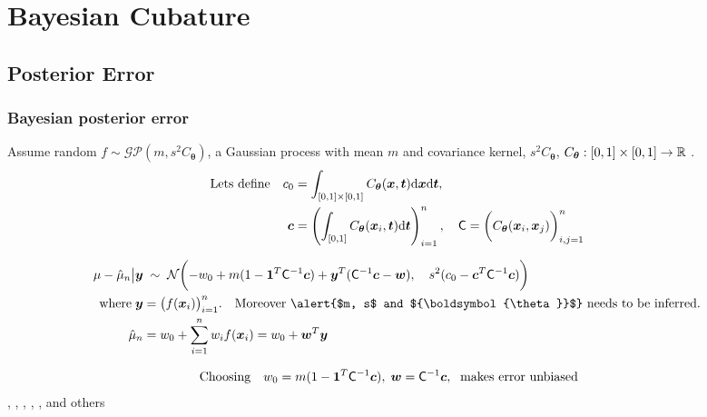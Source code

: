 \documentclass[handout, 10pt,compress,xcolor={usenames,dvipsnames}]{beamer} %
\newcommand{\bm}[1]{\boldsymbol{#1}}
\newcommand{\mCInv}{\mC^{-1}}
\newcommand{\dvx}{\dif {\vx}}
\newcommand{\dvt}{\dif {\vt}}
\renewcommand{\vtheta}{{\bm{\theta}}}
\newcommand{\pause}{}
\begin{document}
\section{Bayesian Cubature}


\subsection{Posterior Error}


\begin{frame}
\frametitle{Bayesian posterior error}
\vspace*{-4ex}
\alert{Assume random}
$f \sim \mathcal{GP} (m, s^2C_{\vtheta})$,
a \alert{Gaussian process} with mean $m$ and covariance kernel, $s^2C_{\vtheta}$, $C_{\vtheta}:[0,1] \times [0,1] \to \reals$ .
\vspace*{-1ex}
\begin{align*}
\text{Lets define} \quad c_0 &= \int_{[0,1] \times [0,1]} C_{\vtheta} (\vx,\vt) \dvx \dvt, 
\\
\vc& = \left( \int_{[0,1] } C_{\vtheta} (\vx_i,\vt) \dvt \right)_{i=1}^n,
\quad
\mC =  \biggl( C_{\vtheta} (\vx_i,\vx_j) \biggr)_{i,j=1}^n
\end{align*}
\pause
\vspace*{-3ex}
\begin{align*}
\mu - \hmu_n  \big \vert \vy & \; \sim \;
\cn
\biggl(-w_0 +
m(1- \bm{1}^T \mathsf{C}^{-1}\vc) +
\vy^T (\mathsf{C}^{-1}\vc - \vw), \quad s^2(c_0 - \vc ^T \mathsf{C}^{-1} \vc)
\biggr)
\\
\text{where} \; \vy &= \bigl(f(\vx_i)\bigr)_{i=1}^n. \quad \text{Moreover \alert{$m, s$ and $\vtheta$} needs to be inferred}.
\\
\hmu_n &= w_0 + \sum_{i=1}^n w_i f(\vx_i) = w_0 + \vw^T \vy
\end{align*}
\pause
\vspace*{-3ex}
\begin{align*}
\text{Choosing} \quad
w_0 & = m(1 - \vone^T \mCInv \vc)
, 
\;
\vw = \mathsf{C}^{-1}\vc, \; \text{ makes error unbiased }
\end{align*}
, , , , ,  and others
\end{frame}
\end{document}
